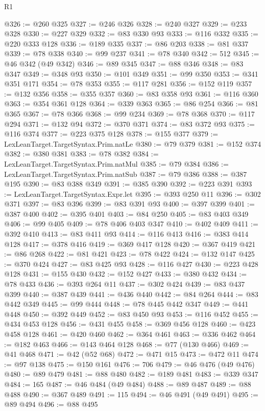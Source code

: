 \begin{lexlean}{R1}
\begin{coremodule}
@326 := @260 @325
@327 := @246 @326
@328 := @240 @327
@329 := @233 @328
@330 := @227 @329
@332 := @83 @330 @93
@333 := @116 @332
@335 := @220 @333 @128
@336 := @189 @335
@337 := @86 @203
@338 := @81 @337
@339 := @78 @338
@340 := @99 @237
@341 := @78 @340
@342 := 512
@345 := @46 @342 (@49 @342)
@346 := @89 @345
@347 := @88 @346
@348 := @83 @347
@349 := @348 @93
@350 := @101 @349
@351 := @99 @350
@353 := @341 @351 @171
@354 := @78 @353
@355 := @117 @281
@356 := @152 @119
@357 := @132 @356
@358 := @355 @357
@360 := @83 @358 @93
@361 := @116 @360
@363 := @354 @361 @128
@364 := @339 @363
@365 := @86 @254
@366 := @81 @365
@367 := @78 @366
@368 := @99 @234
@369 := @78 @368
@370 := @117 @294
@371 := @132 @94
@372 := @370 @371
@374 := @83 @372 @93
@375 := @116 @374
@377 := @223 @375 @128
@378 := @155 @377
@379 := LexLeanTarget.TargetSyntax.Prim.natLe
@380 := @79 @379
@381 := @152 @374
@382 := @380 @381
@383 := @78 @382
@384 := LexLeanTarget.TargetSyntax.Prim.natMul
@385 := @79 @384
@386 := LexLeanTarget.TargetSyntax.Prim.natSub
@387 := @79 @386
@388 := @387 @195
@390 := @83 @388 @349
@391 := @385 @390
@392 := @223 @391
@393 := LexLeanTarget.TargetSyntax.Expr.let
@395 := @393 @250 @11
@396 := @302 @371
@397 := @83 @396
@399 := @83 @391 @93
@400 := @397 @399
@401 := @387 @400
@402 := @395 @401
@403 := @84 @250
@405 := @83 @403 @349
@406 := @99 @405
@409 := @78 @406 @403 @347
@410 := @402 @409
@411 := @392 @410
@413 := @83 @411 @93
@414 := @116 @413
@416 := @383 @414 @128
@417 := @378 @416
@419 := @369 @417 @128
@420 := @367 @419
@421 := @86 @268
@422 := @81 @421
@423 := @78 @422
@424 := @132 @147
@425 := @370 @424
@427 := @83 @425 @93
@428 := @116 @427
@430 := @223 @428 @128
@431 := @155 @430
@432 := @152 @427
@433 := @380 @432
@434 := @78 @433
@436 := @393 @264 @11
@437 := @302 @424
@439 := @83 @437 @399
@440 := @387 @439
@441 := @436 @440
@442 := @84 @264
@444 := @83 @442 @349
@445 := @99 @444
@448 := @78 @445 @442 @347
@449 := @441 @448
@450 := @392 @449
@452 := @83 @450 @93
@453 := @116 @452
@455 := @434 @453 @128
@456 := @431 @455
@458 := @369 @456 @128
@460 := @423 @458 @128
@461 := @420 @460
@462 := @364 @461
@463 := @336 @462
@464 := @182 @463
@466 := @143 @464 @128
@468 := @77 (@130 @466)
@469 := @41 @468
@471 := @42 (@52 @68)
@472 := @471 @15
@473 := @472 @11
@474 := @97 @138
@475 := @150 @161
@476 := 706
@479 := @46 @476 (@49 @476)
@480 := @89 @479
@481 := @88 @480
@482 := @189 @481
@483 := @339 @347
@484 := 165
@487 := @46 @484 (@49 @484)
@488 := @89 @487
@489 := @88 @488
@490 := @367 @489
@491 := 115
@494 := @46 @491 (@49 @491)
@495 := @89 @494
@496 := @88 @495

\end{coremodule}
\end{lexlean}
